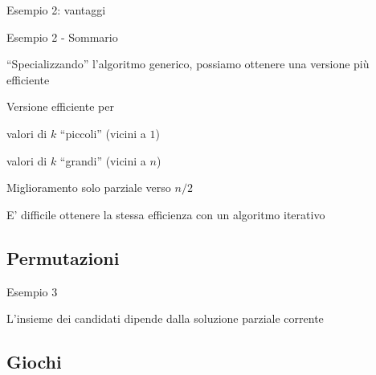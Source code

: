 \begin{frame}{Esempio 2: vantaggi}


\end{frame}

\begin{frame}{Esempio 2 - Sommario}

\BIL
\item  “Specializzando” l'algoritmo generico, possiamo ottenere una versione più efficiente
\item  Versione efficiente per 
\BI
	\item valori di $k$ “piccoli” (vicini a $1$)
	\item valori di $k$ “grandi” (vicini a $n$)
\EI
\item Miglioramento solo parziale verso $n/2$
\item E' difficile ottenere la stessa efficienza con un algoritmo iterativo
\EIL
	
\end{frame}

\subsection{Permutazioni}

\begin{frame}{Esempio 3}

\BI
\item L'insieme dei candidati dipende dalla soluzione parziale corrente
\EI

\begin{Procedure}
\caption[A]{\permutazioni(\Set $A$, \INTEGER $n$, $\Item[\,]\ S$, \INTEGER\ $i$)}
\end{Procedure}

	
	
	
\end{frame}


\subsection{Giochi}

